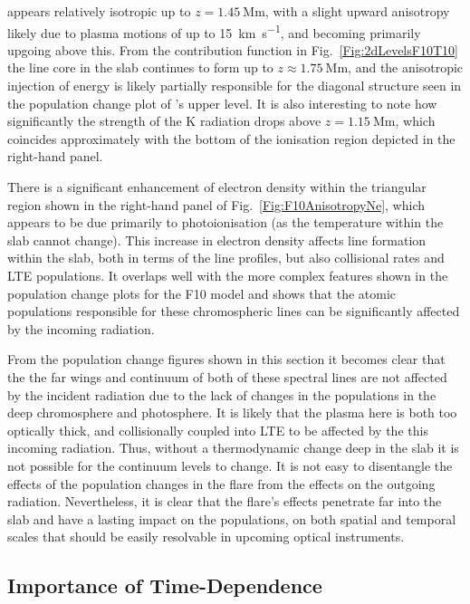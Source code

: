 \Ha{} appears relatively isotropic up to $z=\SI{1.45}{\mega\metre}$, with a slight upward anisotropy likely due to plasma motions of up to \SI{15}{\kilo\metre\per\second}, and becoming primarily upgoing above this.
From the contribution function in Fig.~\ref{Fig:2dLevelsF10T10} the \Ha{} line core in the slab continues to form up to $z\approx\SI{1.75}{\mega\metre}$, and the anisotropic injection of energy is likely partially responsible for the diagonal structure seen in the population change plot of \Ha{}'s upper level.
It is also interesting to note how significantly the strength of the \Caii{} K radiation drops above $z=\SI{1.15}{\mega\metre}$, which coincides approximately with the bottom of the ionisation region depicted in the right-hand panel.

There is a significant enhancement of electron density within the triangular region shown in the right-hand panel of Fig.~\ref{Fig:F10AnisotropyNe}, which appears to be due primarily to photoionisation (as the temperature within the slab cannot change).
This increase in electron density affects line formation within the slab, both in terms of the line profiles, but also collisional rates and LTE populations.
It overlaps well with the more complex features shown in the population change plots for the F10 model and shows that the atomic populations responsible for these chromospheric lines can be significantly affected by the incoming radiation.

From the population change figures shown in this section it becomes clear that the the far wings and continuum of both of these spectral lines are not affected by the incident radiation due to the lack of changes in the populations in the deep chromosphere and photosphere.
It is likely that the plasma here is both too optically thick, and collisionally coupled into LTE to be affected by the this incoming radiation.
Thus, without a thermodynamic change deep in the slab it is not possible for the continuum levels to change.
It is not easy to disentangle the effects of the population changes in the flare from the effects on the outgoing radiation.
Nevertheless, it is clear that the flare's effects penetrate far into the slab and have a lasting impact on the populations, on both spatial and temporal scales that should be easily resolvable in upcoming optical instruments.

\subsection{Importance of Time-Dependence}\label{Sec:2dTimeDepSE}

